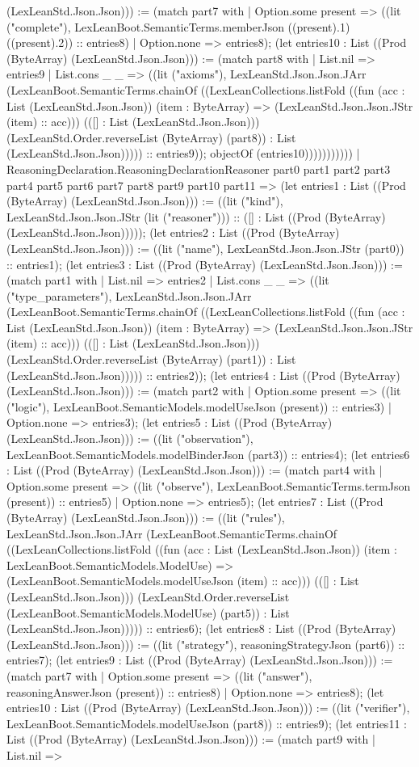 \documentclass[11pt]{article}
\begin{document}
(LexLeanStd.Json.Json))) := (match part7 with | Option.some present => ((lit ("complete"), LexLeanBoot.SemanticTerms.memberJson ((present).1) ((present).2)) :: entries8) | Option.none => entries8); (let entries10 : List ((Prod (ByteArray) (LexLeanStd.Json.Json))) := (match part8 with | List.nil => entries9 | List.cons \_ \_ => ((lit ("axioms"), LexLeanStd.Json.Json.JArr (LexLeanBoot.SemanticTerms.chainOf ((LexLeanCollections.listFold ((fun (acc : List (LexLeanStd.Json.Json)) (item : ByteArray) => (LexLeanStd.Json.Json.JStr (item) :: acc))) (([] : List (LexLeanStd.Json.Json))) (LexLeanStd.Order.reverseList (ByteArray) (part8)) : List (LexLeanStd.Json.Json))))) :: entries9)); objectOf (entries10))))))))))) | ReasoningDeclaration.ReasoningDeclarationReasoner part0 part1 part2 part3 part4 part5 part6 part7 part8 part9 part10 part11 => (let entries1 : List ((Prod (ByteArray) (LexLeanStd.Json.Json))) := ((lit ("kind"), LexLeanStd.Json.Json.JStr (lit ("reasoner"))) :: ([] : List ((Prod (ByteArray) (LexLeanStd.Json.Json))))); (let entries2 : List ((Prod (ByteArray) (LexLeanStd.Json.Json))) := ((lit ("name"), LexLeanStd.Json.Json.JStr (part0)) :: entries1); (let entries3 : List ((Prod (ByteArray) (LexLeanStd.Json.Json))) := (match part1 with | List.nil => entries2 | List.cons \_ \_ => ((lit ("type\_parameters"), LexLeanStd.Json.Json.JArr (LexLeanBoot.SemanticTerms.chainOf ((LexLeanCollections.listFold ((fun (acc : List (LexLeanStd.Json.Json)) (item : ByteArray) => (LexLeanStd.Json.Json.JStr (item) :: acc))) (([] : List (LexLeanStd.Json.Json))) (LexLeanStd.Order.reverseList (ByteArray) (part1)) : List (LexLeanStd.Json.Json))))) :: entries2)); (let entries4 : List ((Prod (ByteArray) (LexLeanStd.Json.Json))) := (match part2 with | Option.some present => ((lit ("logic"), LexLeanBoot.SemanticModels.modelUseJson (present)) :: entries3) | Option.none => entries3); (let entries5 : List ((Prod (ByteArray) (LexLeanStd.Json.Json))) := ((lit ("observation"), LexLeanBoot.SemanticModels.modelBinderJson (part3)) :: entries4); (let entries6 : List ((Prod (ByteArray) (LexLeanStd.Json.Json))) := (match part4 with | Option.some present => ((lit ("observe"), LexLeanBoot.SemanticTerms.termJson (present)) :: entries5) | Option.none => entries5); (let entries7 : List ((Prod (ByteArray) (LexLeanStd.Json.Json))) := ((lit ("rules"), LexLeanStd.Json.Json.JArr (LexLeanBoot.SemanticTerms.chainOf ((LexLeanCollections.listFold ((fun (acc : List (LexLeanStd.Json.Json)) (item : LexLeanBoot.SemanticModels.ModelUse) => (LexLeanBoot.SemanticModels.modelUseJson (item) :: acc))) (([] : List (LexLeanStd.Json.Json))) (LexLeanStd.Order.reverseList (LexLeanBoot.SemanticModels.ModelUse) (part5)) : List (LexLeanStd.Json.Json))))) :: entries6); (let entries8 : List ((Prod (ByteArray) (LexLeanStd.Json.Json))) := ((lit ("strategy"), reasoningStrategyJson (part6)) :: entries7); (let entries9 : List ((Prod (ByteArray) (LexLeanStd.Json.Json))) := (match part7 with | Option.some present => ((lit ("answer"), reasoningAnswerJson (present)) :: entries8) | Option.none => entries8); (let entries10 : List ((Prod (ByteArray) (LexLeanStd.Json.Json))) := ((lit ("verifier"), LexLeanBoot.SemanticModels.modelUseJson (part8)) :: entries9); (let entries11 : List ((Prod (ByteArray) (LexLeanStd.Json.Json))) := (match part9 with | List.nil => 
\end{document}
